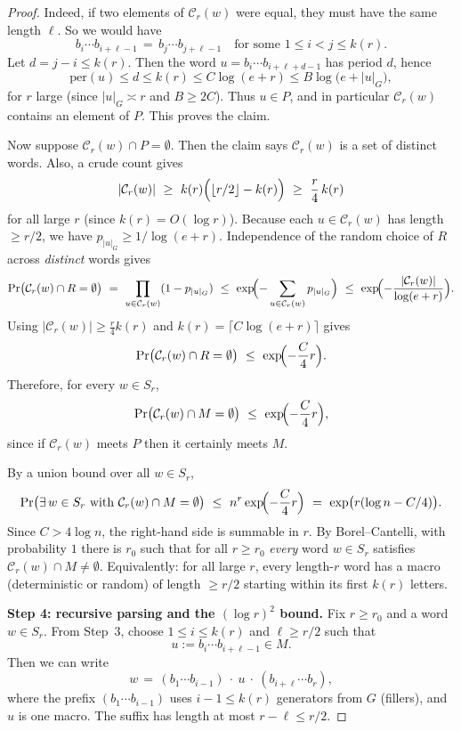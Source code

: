 \documentclass[12pt]{amsart}
\theoremstyle{definition}
\theoremstyle{remark}
\begin{document}
\begin{proof}
\smallskip
\noindent
Indeed, if two elements of $\mathcal{C}_r(w)$ were equal, they must have the same length $\ell$.
So we would have
\[
 b_i\cdots b_{i+\ell-1} \,=\, b_j\cdots b_{j+\ell-1}
\quad\text{for some }1\le i<j\le k(r).
\]
Let $d=j-i\le k(r)$.
Then the word $u=b_i\cdots b_{i+\ell+d-1}$ has period $d$, hence
\[
\mathrm{per}(u)\le d\le k(r)\le C\log(e+r)\le B\log\bigl(e+|u|_G\bigr),
\]
for $r$ large (since $|u|_G\asymp r$ and $B\ge 2C$).
Thus $u\in P$, and in particular $\mathcal{C}_r(w)$ contains an element of $P$.
This proves the claim.

Now suppose $\mathcal{C}_r(w)\cap P=\emptyset$.
Then the claim says $\mathcal{C}_r(w)$ is a set of distinct words.
Also, a crude count gives
\[
|\mathcal{C}_r(w)|
\ \ge\ k(r)\Bigl(\lfloor r/2\rfloor-k(r)\Bigr)
\ \ge\ \frac{r}{4}\,k(r)
\]
for all large $r$ (since $k(r)=O(\log r)$).
Because each $u\in \mathcal{C}_r(w)$ has length $\ge r/2$,
we have $p_{|u|_G}\ge 1/\log(e+r)$.
Independence of the random choice of $R$ across \emph{distinct} words gives
\[
\Pr\bigl(\mathcal{C}_r(w)\cap R=\emptyset\bigr)
\ =\ \prod_{u\in\mathcal{C}_r(w)} (1-p_{|u|_G})
\ \le\ \exp\!\Bigl(-\sum_{u\in\mathcal{C}_r(w)} p_{|u|_G}\Bigr)
\ \le\ \exp\!\Bigl(-\frac{|\mathcal{C}_r(w)|}{\log(e+r)}\Bigr).
\]
Using $|\mathcal{C}_r(w)|\ge \frac{r}{4}k(r)$ and $k(r)=\lceil C\log(e+r)\rceil$ gives
\[
\Pr\bigl(\mathcal{C}_r(w)\cap R=\emptyset\bigr)
\ \le\ \exp\!\Bigl(-\frac{C}{4}r\Bigr).
\]
Therefore, for every $w\in S_r$,
\[
\Pr\bigl(\mathcal{C}_r(w)\cap M=\emptyset\bigr)
\ \le\ \exp\!\Bigl(-\frac{C}{4}r\Bigr),
\]
since if $\mathcal{C}_r(w)$ meets $P$ then it certainly meets $M$.

By a union bound over all $w\in S_r$,
\[
\Pr\bigl(\exists\, w\in S_r \text{ with }\mathcal{C}_r(w)\cap M=\emptyset\bigr)
\ \le\ n^r \exp\!\Bigl(-\frac{C}{4}r\Bigr)
\ =\ \exp\bigl(r(\log n - C/4)\bigr).
\]
Since $C>4\log n$, the right-hand side is summable in $r$.
By Borel--Cantelli, with probability $1$ there is $r_0$ such that for all $r\ge r_0$
\emph{every} word $w\in S_r$ satisfies $\mathcal{C}_r(w)\cap M\neq\emptyset$.
Equivalently: for all large $r$, every length-$r$ word has a macro (deterministic or random)
of length $\ge r/2$ starting within its first $k(r)$ letters.

\medskip
\noindent\textbf{Step 4: recursive parsing and the $(\log r)^2$ bound.}
Fix $r\ge r_0$ and a word $w\in S_r$.
From Step~3, choose $1\le i\le k(r)$ and $\ell\ge r/2$ such that
\[
 u:=b_i\cdots b_{i+\ell-1}\in M.
\]
Then we can write
\[
 w \,=\, (b_1\cdots b_{i-1})\ \cdot\ u\ \cdot\ (b_{i+\ell}\cdots b_r),
\]
where the prefix $(b_1\cdots b_{i-1})$ uses $i-1\le k(r)$ generators from $G$ (fillers),
and $u$ is one macro.
The suffix has length at most $r-\ell \le r/2$.


\end{proof}
\end{document}
